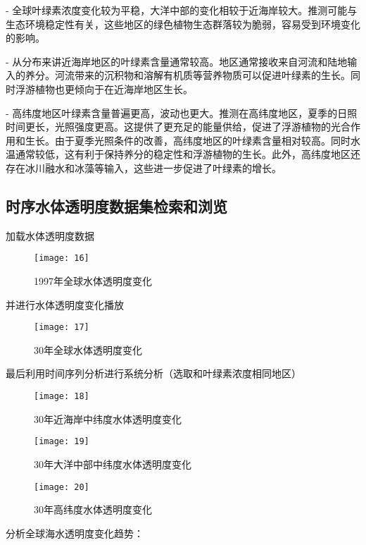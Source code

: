 \documentclass{source/Report}
\begin{document}
- 全球叶绿素浓度变化较为平稳，大洋中部的变化相较于近海岸较大。推测可能与生态环境稳定性有关，这些地区的绿色植物生态群落较为脆弱，容易受到环境变化的影响。

- 从分布来讲近海岸地区的叶绿素含量通常较高。地区通常接收来自河流和陆地输入的养分。河流带来的沉积物和溶解有机质等营养物质可以促进叶绿素的生长。同时浮游植物也更倾向于在近海岸地区生长。

- 高纬度地区叶绿素含量普遍更高，波动也更大。推测在高纬度地区，夏季的日照时间更长，光照强度更高。这提供了更充足的能量供给，促进了浮游植物的光合作用和生长。由于夏季光照条件的改善，高纬度地区的叶绿素含量相对较高。同时水温通常较低，这有利于保持养分的稳定性和浮游植物的生长。此外，高纬度地区还存在冰川融水和冰藻等输入，这些进一步促进了叶绿素的增长。

\subsection{时序水体透明度数据集检索和浏览}

加载水体透明度数据

\begin{figure}[H]
    \centering
    \texttt{[image: 16]}
    \caption{1997年全球水体透明度变化}
\end{figure}

并进行水体透明度变化播放

\begin{figure}[H]
    \centering
    \texttt{[image: 17]}
    \caption{30年全球水体透明度变化}
\end{figure}

最后利用时间序列分析进行系统分析（选取和叶绿素浓度相同地区）

\begin{figure}[H]
    \centering
    \texttt{[image: 18]}
    \caption{30年近海岸中纬度水体透明度变化}
\end{figure}

\begin{figure}[H]
    \centering
    \texttt{[image: 19]}
    \caption{30年大洋中部中纬度水体透明度变化}
\end{figure}

\begin{figure}[H]
    \centering
    \texttt{[image: 20]}
    \caption{30年高纬度水体透明度变化}
\end{figure}

分析全球海水透明度变化趋势：
\end{document}
